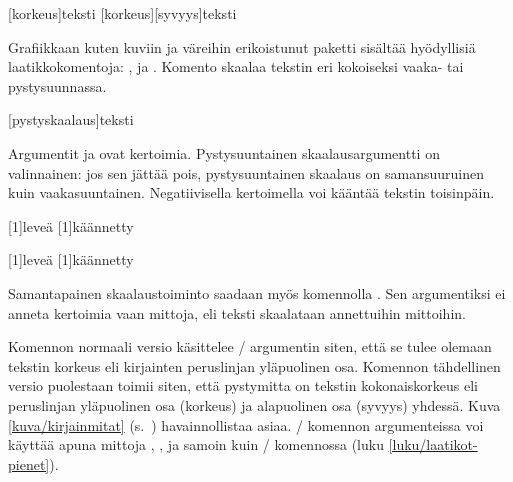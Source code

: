 \begin{koodilohkosis}
\raisebox{etäisyysmitta}[korkeus]{teksti}
\raisebox{etäisyysmitta}[korkeus][syvyys]{teksti}
\end{koodilohkosis}

\noindent
Grafiikkaan kuten kuviin ja väreihin erikoistunut paketti
 sisältää hyödyllisiä laatikkokomentoja:
,  ja . Komento
 skaalaa tekstin eri kokoiseksi vaaka- tai
pystysuunnassa.

\begin{koodilohkosis}
\scalebox{vaakaskaalaus}[pystyskaalaus]{teksti}
\end{koodilohkosis}

\noindent
Argumentit  ja  ovat
kertoimia. Pystysuuntainen skaalausargumentti on valinnainen: jos sen
jättää pois, pystysuuntainen skaalaus on samansuuruinen kuin
vaakasuuntainen. Negatiivisella kertoimella voi kääntää tekstin
toisinpäin.

\begin{koodilohkosis}
\scalebox{2}[1]{leveä} \scalebox{-1}[1]{käännetty}
\end{koodilohkosis}

\begin{tulossis}
  \scalebox{2}[1]{leveä} \scalebox{-1}[1]{käännetty}
\end{tulossis}

\noindent
Samantapainen skaalaustoiminto saadaan myös komennolla
. Sen argumentiksi ei anneta kertoimia vaan mittoja,
eli teksti skaalataan annettuihin mittoihin.

\begin{koodilohkosis}
\end{koodilohkosis}

\noindent
Komennon  normaali versio käsittelee
\-/ argumentin siten, että se tulee olemaan tekstin
korkeus eli kirjainten peruslinjan yläpuolinen osa. Komennon
 tähdellinen versio puolestaan toimii siten, että
pystymitta on tekstin kokonaiskorkeus eli peruslinjan yläpuolinen osa
(korkeus) ja alapuolinen osa (syvyys) yhdessä. Kuva
\ref{kuva/kirjainmitat} (s.~\pageref{kuva/kirjainmitat}) havainnollistaa
asiaa. \-/ komennon argumenteissa voi käyttää apuna
mittoja , ,  ja
 samoin kuin \-/ komennossa (luku
\ref{luku/laatikot-pienet}).


